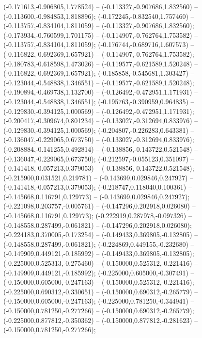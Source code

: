  (-0.171613,-0.906805,1.778524) -- (-0.113327,-0.907686,1.832560) -- (-0.113600,-0.984853,1.818896);
 (-0.172245,-0.832540,1.757460) -- (-0.113757,-0.834104,1.811059) -- (-0.113327,-0.907686,1.832560);
 (-0.173934,-0.760599,1.701175) -- (-0.114907,-0.762764,1.753582) -- (-0.113757,-0.834104,1.811059);
 (-0.176744,-0.689716,1.607573) -- (-0.116822,-0.692369,1.657921) -- (-0.114907,-0.762764,1.753582);
 (-0.180783,-0.618598,1.473026) -- (-0.119577,-0.621589,1.520248) -- (-0.116822,-0.692369,1.657921);
 (-0.185858,-0.545681,1.303427) -- (-0.123044,-0.548838,1.346551) -- (-0.119577,-0.621589,1.520248);
 (-0.190894,-0.469738,1.132700) -- (-0.126492,-0.472951,1.171931) -- (-0.123044,-0.548838,1.346551);
 (-0.195763,-0.390959,0.964835) -- (-0.129830,-0.394125,1.000569) -- (-0.126492,-0.472951,1.171931);
 (-0.200417,-0.309674,0.801234) -- (-0.133027,-0.312694,0.833976) -- (-0.129830,-0.394125,1.000569);
 (-0.204807,-0.226283,0.643381) -- (-0.136047,-0.229065,0.673750) -- (-0.133027,-0.312694,0.833976);
 (-0.208884,-0.141255,0.492814) -- (-0.138856,-0.143722,0.521548) -- (-0.136047,-0.229065,0.673750);
 (-0.212597,-0.055123,0.351097) -- (-0.141418,-0.057213,0.379053) -- (-0.138856,-0.143722,0.521548);
 (-0.215900,0.031521,0.219781) -- (-0.143699,0.029846,0.247927) -- (-0.141418,-0.057213,0.379053);
 (-0.218747,0.118040,0.100361) -- (-0.145668,0.116791,0.129773) -- (-0.143699,0.029846,0.247927);
 (-0.221098,0.203757,-0.005761) -- (-0.147296,0.202918,0.026080) -- (-0.145668,0.116791,0.129773);
 (-0.222919,0.287978,-0.097326) -- (-0.148558,0.287499,-0.061821) -- (-0.147296,0.202918,0.026080);
 (-0.224183,0.370005,-0.173254) -- (-0.149433,0.369805,-0.132805) -- (-0.148558,0.287499,-0.061821);
 (-0.224869,0.449155,-0.232680) -- (-0.149909,0.449121,-0.185992) -- (-0.149433,0.369805,-0.132805);
 (-0.225000,0.525313,-0.275460) -- (-0.150000,0.525312,-0.221416) -- (-0.149909,0.449121,-0.185992);
 (-0.225000,0.605000,-0.307491) -- (-0.150000,0.605000,-0.247163) -- (-0.150000,0.525312,-0.221416);
 (-0.225000,0.690312,-0.330651) -- (-0.150000,0.690312,-0.265779) -- (-0.150000,0.605000,-0.247163);
 (-0.225000,0.781250,-0.344941) -- (-0.150000,0.781250,-0.277266) -- (-0.150000,0.690312,-0.265779);
 (-0.225000,0.877812,-0.350362) -- (-0.150000,0.877812,-0.281623) -- (-0.150000,0.781250,-0.277266);
